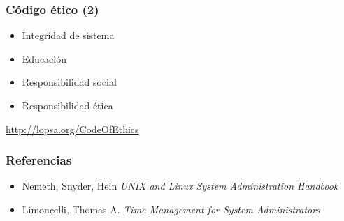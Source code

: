 \documentclass{beamer}
\begin{document}

\begin{frame}
\frametitle{Código ético (2)}

\begin{itemize}
\item Integridad de sistema
\item Educación
\item Responsibilidad social
\item Responsibilidad ética
\end{itemize}

\url{http://lopsa.org/CodeOfEthics}

\end{frame}


\begin{frame}
\frametitle{Referencias}

\begin{itemize}
\item Nemeth, Snyder, Hein \textit{UNIX and Linux System Administration Handbook}
\item Limoncelli, Thomas A. \textit{Time Management for System Administrators} 
\end{itemize}

\end{frame}
\end{document}
